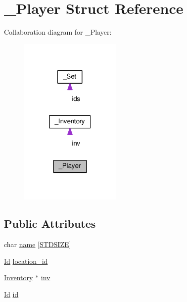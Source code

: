 \hypertarget{struct__Player}{\section{\+\_\+\+Player Struct Reference}
\label{struct__Player}
}


Collaboration diagram for \+\_\+\+Player\+:\nopagebreak
\begin{figure}[H]
\begin{center}
\leavevmode
\includegraphics[width=140pt]{struct__Player__coll__graph}
\end{center}
\end{figure}
\subsection*{Public Attributes}
\begin{DoxyCompactItemize}
\item 
char \hyperlink{struct__Player_abd3fbad9568ff1e608654d58e71b8c58}{name} \mbox{[}\hyperlink{types_8h_a431b1676533a0e1714aff7d6a5542406}{S\+T\+D\+S\+I\+Z\+E}\mbox{]}
\item 
\hyperlink{types_8h_a845e604fb28f7e3d97549da3448149d3}{Id} \hyperlink{struct__Player_aca2cb83e7a18dea36c33ad94e36a1e54}{location\+\_\+id}
\item 
\hyperlink{inventory_8h_a2253bf64ac4ce6a9c1d6f39c0b0d32a3}{Inventory} $\ast$ \hyperlink{struct__Player_aaaeeb03326c37ce62c333c2b94fde23c}{inv}
\item 
\hyperlink{types_8h_a845e604fb28f7e3d97549da3448149d3}{Id} \hyperlink{struct__Player_a60d635cd063816a9c1bd873f4868bb90}{id}
\end{DoxyCompactItemize}


